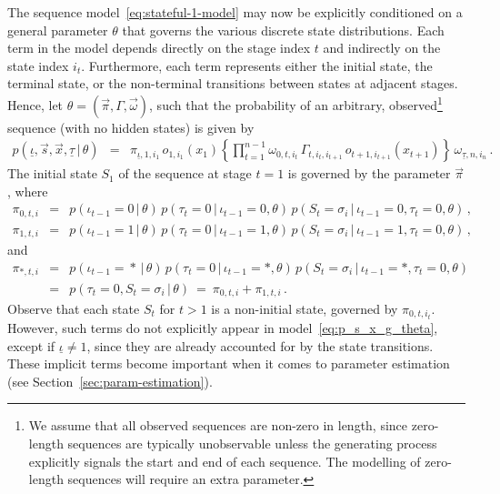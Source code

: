 \documentclass[a4paper]{article}
\begin{document}
The sequence model~\eqref{eq:stateful-1-model}
may now be explicitly conditioned on a general parameter $\theta$
that governs the various discrete state distributions. Each term in the model depends directly on the stage index $t$ and 
indirectly on the state index $i_t$. 
Furthermore, each term represents either the initial state, the terminal state, or the non-terminal transitions
between states at adjacent stages. Hence, let $\theta=(\vec{\pi},\Gamma,\vec{\omega})$, 
such that the probability of an arbitrary, observed\footnote{We assume that all observed sequences are non-zero in length,
since zero-length sequences are typically unobservable unless the generating process explicitly signals the start
and end of each sequence. The modelling of zero-length sequences will require an extra parameter.} sequence (with no hidden states) is given by
\begin{eqnarray}
p(\underline{\iota},\vec{s},\vec{x},\underline{\tau}\,|\,\theta) & = & \pi_{\underline{\iota},1,i_1}\,o_{1,i_1}(x_1)\left\{\prod_{t=1}^{n-1}\omega_{0,t,i_t}\,\Gamma_{t,i_t,i_{t+1}}\,o_{t+1,i_{t+1}}(x_{t+1})
\right\}\,\omega_{\underline{\tau},n,i_n}
\,.
\label{eq:p_s_x_g_theta}
\end{eqnarray}
The initial state $S_1$ of the sequence at stage $t=1$ is governed by the parameter $\vec{\pi}$, where
\begin{eqnarray}
  \pi_{0,t,i} & = & p(\iota_{t-1}\!=\!0\,|\,\theta)\,p(\tau_t\!=\!0\,|\,\iota_{t-1}\!=\!0,\theta)
      \,p(S_t\!=\!\sigma_{i}\,|\,\iota_{t-1}\!=\!0,\tau_t\!=\!0,\theta)\,,
\\
  \pi_{1,t,i} & = & p(\iota_{t-1}\!=\!1\,|\,\theta)\,p(\tau_t\!=\!0\,|\,\iota_{t-1}\!=\!1,\theta)
      \,p(S_t\!=\!\sigma_{i}\,|\,\iota_{t-1}\!=\!1,\tau_t\!=\!0,\theta)\,,
\end{eqnarray}
and
\begin{eqnarray}
  \pi_{*,t,i} & = & p(\iota_{t-1}\!=\!*\,|\,\theta)\,p(\tau_t\!=\!0\,|\,\iota_{t-1}\!=\!*,\theta)
      \,p(S_t\!=\!\sigma_{i}\,|\,\iota_{t-1}\!=\!*,\tau_t\!=\!0,\theta)
\nonumber\\& = &
  p(\tau_t\!=\!0,S_t\!=\!\sigma_i\,|\,\theta)~=~\pi_{0,t,i}+\pi_{1,t,i}\,.
\end{eqnarray}
Observe that each state $S_t$ for $t>1$ is a non-initial state, governed by $\pi_{0,t,i_t}$. However, such terms do
not explicitly appear in model~\eqref{eq:p_s_x_g_theta}, except if $\underline{\iota}\ne 1$, 
since they are already accounted for by the state transitions.
These implicit terms become important when it comes to parameter estimation (see Section~\ref{sec:param-estimation}).
\end{document}
